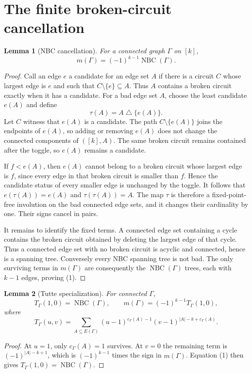 \documentclass[11pt]{article}
\newtheorem{lemma}{Lemma}
\newcommand{\NBC}{\operatorname{NBC}}
\newcommand{\1}{\mathbf{1}}
\begin{document}
\section{The finite broken-circuit cancellation}

\begin{lemma}[NBC cancellation]
For a connected graph $\Gamma$ on $[k]$,
\[
 m(\Gamma)=(-1)^{k-1}\NBC(\Gamma).
\tag{1}
\]
\end{lemma}

\begin{proof}
Call an edge $e$ a candidate for an edge set $A$ if there is a circuit $C$
whose largest edge is $e$ and such that $C\setminus\{e\}\subseteq A$.  Thus
$A$ contains a broken circuit exactly when it has a candidate.  For a bad
edge set $A$, choose the least candidate $e(A)$ and define
\[
 \tau(A)=A\mathbin{\triangle}\{e(A)\}.
\]
Let $C$ witness that $e(A)$ is a candidate.  The path
$C\setminus\{e(A)\}$ joins the endpoints of $e(A)$, so adding or removing
$e(A)$ does not change the connected components of $([k],A)$.  The same broken
circuit remains contained after the toggle, so $e(A)$ remains a candidate.

If $f<e(A)$, then $e(A)$ cannot belong to a broken circuit whose largest edge
is $f$, since every edge in that broken circuit is smaller than $f$.  Hence
the candidate status of every smaller edge is unchanged by the toggle.  It
follows that $e(\tau(A))=e(A)$ and $\tau(\tau(A))=A$.  The map $\tau$ is
therefore a fixed-point-free involution on the bad connected edge sets, and it
changes their cardinality by one.  Their signs cancel in pairs.

It remains to identify the fixed terms.  A connected edge set containing a
cycle contains the broken circuit obtained by deleting the largest edge of
that cycle.  Thus a connected edge set with no broken circuit is acyclic and
connected, hence is a spanning tree.  Conversely every NBC spanning tree is
not bad.  The only surviving terms in $m(\Gamma)$ are consequently the
$\NBC(\Gamma)$ trees, each with $k-1$ edges, proving (1).
\end{proof}

\begin{lemma}[Tutte specialization]
For connected $\Gamma$,
\[
 T_\Gamma(1,0)=\NBC(\Gamma),\qquad
 m(\Gamma)=(-1)^{k-1}T_\Gamma(1,0),
\]
where
\[
 T_\Gamma(u,v)=\sum_{A\subseteq E(\Gamma)}
 (u-1)^{c_\Gamma(A)-1}(v-1)^{|A|-k+c_\Gamma(A)}.
\]
\end{lemma}

\begin{proof}
At $u=1$, only $c_\Gamma(A)=1$ survives.  At $v=0$ the remaining term is
$(-1)^{|A|-k+1}$, which is $(-1)^{k-1}$ times the sign in $m(\Gamma)$.
Equation (1) then gives $T_\Gamma(1,0)=\NBC(\Gamma)$.
\end{proof}
\end{document}

